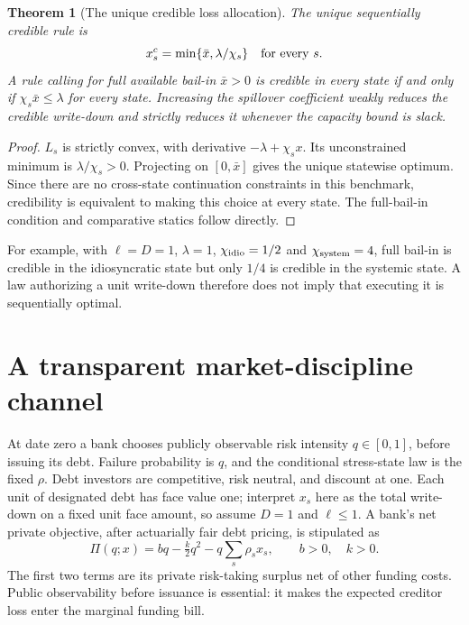 \documentclass[11pt]{article}
\newtheorem{theorem}{Theorem}
\theoremstyle{definition}
\begin{document}
\begin{theorem}[The unique credible loss allocation]
The unique sequentially credible rule is
\[
 x_s^c=\min\{\bar x,\lambda/\chi_s\}\quad\hbox{for every }s.
\]
A rule calling for full available bail-in $\bar x>0$ is credible in every state if and only if $\chi_s\bar x\leq\lambda$ for every state. Increasing the spillover coefficient weakly reduces the credible write-down and strictly reduces it whenever the capacity bound is slack.
\end{theorem}
\begin{proof}
$L_s$ is strictly convex, with derivative $-\lambda+\chi_s x$. Its unconstrained minimum is $\lambda/\chi_s>0$. Projecting on $[0,\bar x]$ gives the unique statewise optimum. Since there are no cross-state continuation constraints in this benchmark, credibility is equivalent to making this choice at every state. The full-bail-in condition and comparative statics follow directly.
\end{proof}
For example, with $\ell=D=1$, $\lambda=1$, $\chi_{\rm idio}=1/2$ and $\chi_{\rm system}=4$, full bail-in is credible in the idiosyncratic state but only $1/4$ is credible in the systemic state. A law authorizing a unit write-down therefore does not imply that executing it is sequentially optimal.

\section*{A transparent market-discipline channel}
At date zero a bank chooses publicly observable risk intensity $q\in[0,1]$, before issuing its debt. Failure probability is $q$, and the conditional stress-state law is the fixed $\rho$. Debt investors are competitive, risk neutral, and discount at one. Each unit of designated debt has face value one; interpret $x_s$ here as the total write-down on a fixed unit face amount, so assume $D=1$ and $\ell\leq1$. A bank's net private objective, after actuarially fair debt pricing, is stipulated as
\[
 \Pi(q;x)=bq-\tfrac{k}{2}q^2-q\sum_s\rho_s x_s,
 \qquad b>0,\quad k>0.
\]
The first two terms are its private risk-taking surplus net of other funding costs. Public observability before issuance is essential: it makes the expected creditor loss enter the marginal funding bill.
\end{document}

